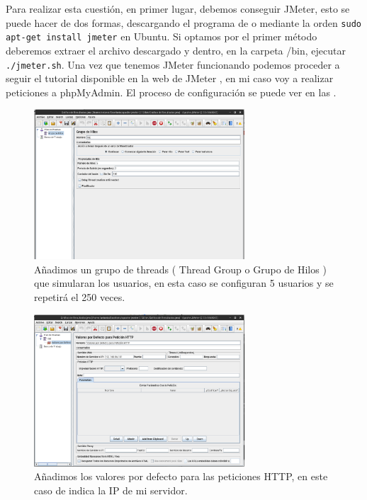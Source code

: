 Para realizar esta cuestión, en primer lugar, debemos conseguir JMeter, esto se puede hacer de dos formas, descargando el programa de \cite{jm} o mediante la orden \texttt{sudo apt-get install jmeter} en Ubuntu. Si optamos por el primer método deberemos extraer el archivo descargado y dentro, en la carpeta /bin, ejecutar \texttt{./jmeter.sh}. Una vez que tenemos JMeter funcionando podemos proceder a seguir el tutorial disponible en la web de JMeter \cite{tut}, en mi caso voy a realizar peticiones a phpMyAdmin. El proceso de configuración se puede ver en las .

\begin{figure}[H]
  \begin{center}
    \includegraphics[width=0.7\textwidth]{imagenes/jm1}
    \caption{Añadimos un grupo de threads ( Thread Group o Grupo de Hilos ) que simularan los usuarios, en esta caso se configuran 5 usuarios y se repetirá el 250 veces.}
    \label{fig7}
  \end{center}
\end{figure}

\begin{figure}[H]
  \begin{center}
    \includegraphics[width=0.7\textwidth]{imagenes/jm2}
    \caption{Añadimos los valores por defecto para las peticiones HTTP, en este caso de indica la IP de mi servidor.}
    \label{fig8}
  \end{center}
\end{figure}

